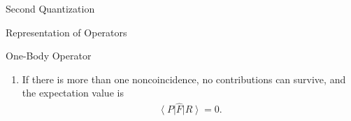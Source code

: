 \documentclass[twoside,english]{uiofysmaster}
\begin{document}
\begin{chapter}{Second Quantization}
\begin{section}{Representation of Operators}
\begin{subsection}{One-Body Operator}
\begin{enumerate}
				\begin{align}
					(p = r), \: (s = q), \: ..., \: (n \neq m), \: ..., \: (N = N),
				\end{align}
				meaning that we can rewrite the expectation value as
				\begin{align}
					\sum_{pq} f_{pq} \left< 0 \right| \hat a_M ... \hat a_s \hat a_r (\hat a_k^\dagger \hat a_l) \hat a_p^\dagger \hat a_q^\dagger ... \hat a_N^\dagger \left| 0 \right> = (-1)^{\sigma(P)} f_{mn},
				\end{align}
				because the operators $\hat a_k^\dagger$ and $\hat a_l$ must be paired with the non-identical states $m$ and $n$ for us to be left with a orthogonal inner product.
				\item If there is more than one noncoincidence, no contributions can survive, and the expectation value is 
				\begin{align}
					\left< P \right| \hat F \left| R \right> = 0.
				\end{align}
			\end{enumerate}
		\end{subsection}


\end{section}
\end{chapter}
\end{document}
